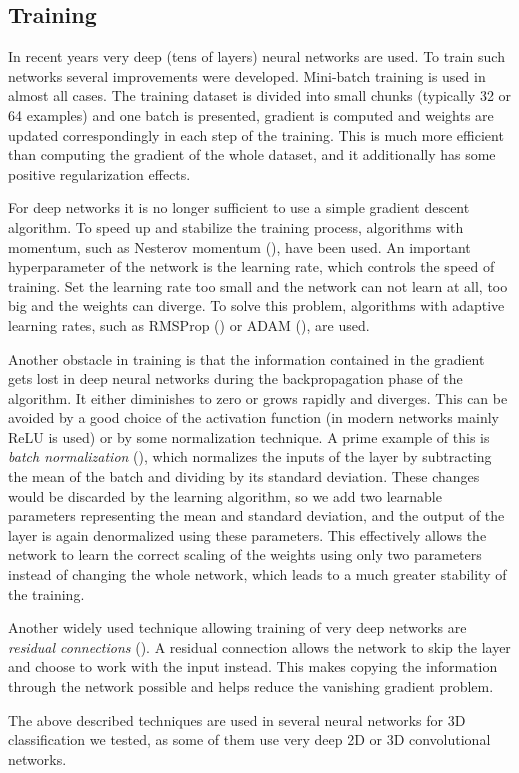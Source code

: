 \subsection{Training}
\label{sec:training}
In recent years very deep (tens of layers) neural networks are used. To train such networks several improvements were developed. Mini-batch training is used in almost all cases. The training dataset is divided into small chunks (typically 32 or 64 examples) and one batch is presented, gradient is computed and weights are updated correspondingly in each step of the training. This is much more efficient than computing the gradient of the whole dataset, and it additionally has some positive regularization effects. \par
For deep networks it is no longer sufficient to use a simple gradient descent algorithm. To speed up and stabilize the training process, algorithms with momentum, such as Nesterov momentum (\cite{sutskever_importance_2013}), have been used. An important hyperparameter of the network is the learning rate, which controls the speed of training. Set the learning rate too small and the network can not learn at all, too big and the weights can diverge. To solve this problem, algorithms with adaptive learning rates, such as 
RMSProp (\cite{hinton_neural_2012}) or ADAM (\cite{kingma_adam:_2014}), are used. \par
Another obstacle in training is that the information contained in the gradient gets lost in deep neural networks during the backpropagation phase of the algorithm. It either diminishes to zero or grows rapidly and diverges. This can be avoided by a good choice of the activation function (in modern networks mainly ReLU is used) or by some normalization technique. A prime example of this is \textit{batch normalization} (\cite{ioffe_batch_2015}), which normalizes the inputs of the layer by subtracting the mean of the batch and dividing by its standard deviation. These changes would be discarded by the learning algorithm, so we add two learnable parameters representing the mean and standard deviation, and the output of the layer is again denormalized using these parameters. This effectively allows the network to learn the correct scaling of the weights using only two parameters instead of changing the whole network, which leads to a much greater stability of the training.\par
Another widely used technique allowing training of very deep networks are \textit{residual connections} (\cite{szegedy_inception-v4_2016}). A residual connection allows the network to skip the layer and choose to work with the input instead. This makes copying the information through the network possible and helps reduce the vanishing gradient problem. \par
The above described techniques are used in several neural networks for 3D classification we tested, as some of them use very deep 2D or 3D convolutional networks.

